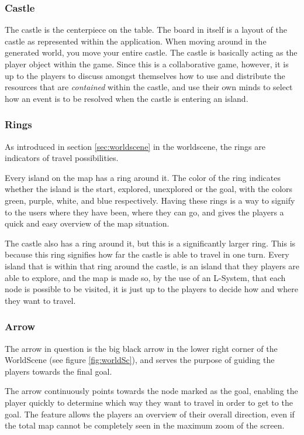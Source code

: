 \subsubsection{Castle}
The castle is the centerpiece on the table. The board in itself is a layout of the castle as represented within the application.
When moving around in the generated world, you move your entire castle. The castle is basically acting as the player object within the game. Since this is a collaborative game, however, it is up to the players to discuss amongst themselves how to use and distribute the resources that are \textit{contained} within the castle, and use their own minds to select how an event is to be resolved when the castle is entering an island.

\subsubsection{Rings}
As introduced in section \ref{sec:worldscene} in the worldscene, the rings are indicators of travel possibilities.

Every island on the map has a ring around it. The color of the ring indicates whether the island is the start, explored, unexplored or the goal, with the colors green, purple, white, and blue respectively. Having these rings is a way to signify to the users where they have been, where they can go, and gives the players a quick and easy overview of the map situation.

The castle also has a ring around it, but this is a significantly larger ring. This is because this ring signifies how far the castle is able to travel in one turn. Every island that is within that ring around the castle, is an island that they players are able to explore, and the map is made so, by the use of an L-System, that each node is possible to be visited, it is just up to the players to decide how and where they want to travel.

\subsubsection{Arrow}
The arrow in question is the big black arrow in the lower right corner of the WorldScene (see figure \ref{fig:worldSc}), and serves the purpose of guiding the players towards the final goal.

The arrow continuously points towards the node marked as the goal, enabling the player quickly to determine which way they want to travel in order to get to the goal. 
The feature allows the players an overview of their overall direction, even if the total map cannot be completely seen in the maximum zoom of the screen. 

